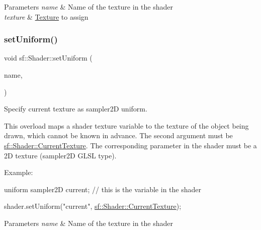 \begin{DoxyParams}{Parameters}
{\em name} & Name of the texture in the shader \\
\hline
{\em texture} & \hyperlink{classsf_1_1_texture}{Texture} to assign \\
\hline
\end{DoxyParams}
\mbox{\label{classsf_1_1_shader_ab18f531e1f726b88fec1cf5a1e6af26d}} 
\subsubsection{\texorpdfstring{set\+Uniform()}{setUniform()}\hspace{0.1cm}{\footnotesize\ttfamily [16/16]}}
{\footnotesize\ttfamily void sf\+::\+Shader\+::set\+Uniform (\begin{DoxyParamCaption}\item[{const std\+::string \&}]{name,  }\item[{\hyperlink{structsf_1_1_shader_1_1_current_texture_type}{Current\+Texture\+Type}}]{ }\end{DoxyParamCaption})}



Specify current texture as {\ttfamily sampler2D} uniform. 

This overload maps a shader texture variable to the texture of the object being drawn, which cannot be known in advance. The second argument must be \hyperlink{classsf_1_1_shader_ac84c7953eec2e19358ea6e2cc5385b8d}{sf\+::\+Shader\+::\+Current\+Texture}. The corresponding parameter in the shader must be a 2D texture ({\ttfamily sampler2D} G\+L\+SL type).

Example\+: 
\begin{DoxyCode}
uniform sampler2D current; \textcolor{comment}{// this is the variable in the shader}
\end{DoxyCode}
 
\begin{DoxyCode}
shader.setUniform(\textcolor{stringliteral}{"current"}, \hyperlink{classsf_1_1_shader_ac84c7953eec2e19358ea6e2cc5385b8d}{sf::Shader::CurrentTexture});
\end{DoxyCode}



\begin{DoxyParams}{Parameters}
{\em name} & Name of the texture in the shader \\
\hline
\end{DoxyParams}
\mbox{\label{classsf_1_1_shader_a731d3b9953c50fe7d3fb03340b97deff}} 

